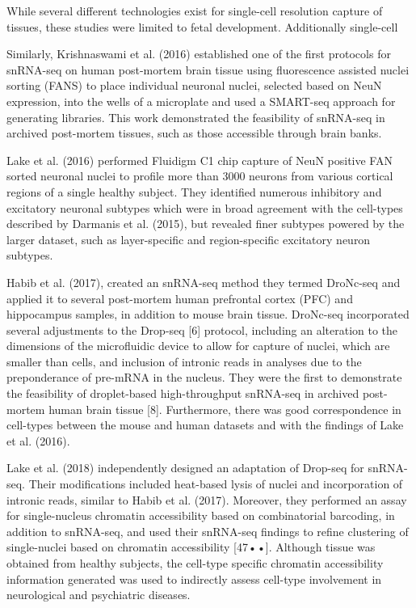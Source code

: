 \documentclass[12pt]{article}
\begin{document}
While several different technologies exist for single-cell resolution capture of tissues, these studies were limited to fetal development. Additionally single-cell 




Similarly,  Krishnaswami et al. (2016) established one of the first protocols for snRNA-seq on human post-mortem brain tissue using fluorescence assisted nuclei sorting (FANS) to place individual neuronal nuclei, selected based on NeuN expression, into the wells of a microplate and used a SMART-seq approach for generating libraries. This work demonstrated  the feasibility of snRNA-seq in archived post-mortem tissues, such as those accessible through brain banks.


Lake et al. (2016) performed Fluidigm C1 chip capture of NeuN positive FAN sorted neuronal nuclei to profile more than 3000 neurons from various cortical regions of a single healthy subject.
They identified numerous inhibitory and excitatory neuronal subtypes which were in broad agreement with the cell-types described by Darmanis et al. (2015), but revealed finer subtypes powered by the larger dataset, such as layer-specific and region-specific excitatory neuron subtypes.

Habib et al. (2017), created an snRNA-seq method they termed DroNc-seq and applied it to several post-mortem human prefrontal cortex (PFC) and hippocampus samples, in addition to mouse brain tissue. DroNc-seq incorporated several adjustments to the Drop-seq [6] protocol, including an alteration to the dimensions of the microfluidic device to allow for capture of nuclei, which are smaller than cells, and inclusion of intronic reads in analyses due to the preponderance of pre-mRNA in the nucleus. They were the first to demonstrate the feasibility of droplet-based high-throughput snRNA-seq in archived post-mortem human brain tissue [8]. Furthermore, there was good correspondence in cell-types between the mouse and human datasets and with the findings of Lake et al. (2016).

Lake et al. (2018) independently designed an adaptation of Drop-seq for snRNA-seq. Their modifications included heat-based lysis of nuclei and incorporation of intronic reads, similar to Habib et al. (2017). Moreover, they performed an assay for single-nucleus chromatin accessibility based on combinatorial barcoding, in addition to snRNA-seq, and used their snRNA-seq findings to refine clustering of single-nuclei based on chromatin accessibility [47••]. Although tissue was obtained from healthy subjects, the cell-type specific chromatin accessibility information generated was used to indirectly assess cell-type involvement in neurological and psychiatric diseases.
\end{document}
